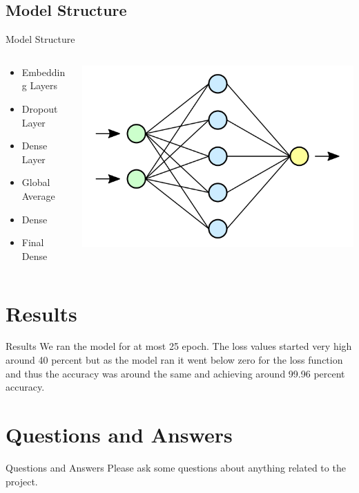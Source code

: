 \documentclass{beamer}
\begin{document}
\subsection{Model Structure}
\begin{frame}{Model Structure}
	\begin{columns}
		\begin{column}{.5\textwidth}
	\begin{itemize}
		\item<1-> Embedding Layers
		\item<2-> Dropout Layer
		\item<3-> Dense Layer
		\item<4-> Global Average
		\item<5-> Dense
		\item<6-> Final Dense
	\end{itemize}
		\end{column}
		\begin{column}{\textwidth}
			\includegraphics[width=.5\textwidth]{nn}
		\end{column}
	\end{columns}
\end{frame}

\section{Results}
\begin{frame}{Results}
	We ran the model for at most 25 epoch.
	The loss values started very high around 40 percent but as the model ran it went below zero for the loss function and thus the accuracy was around the same and achieving around 99.96 percent accuracy.
\end{frame}

\section{Questions and Answers}
\begin{frame}{Questions and Answers}
	Please ask some questions about anything related to the project.
\end{frame}
\end{document}

